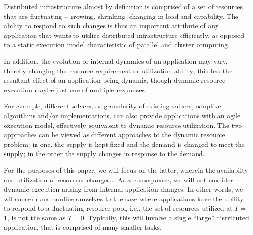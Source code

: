 \documentclass[conference,final]{IEEEtran}
\newcommand{\jhanote}[1]{ {\textcolor{red} { ***shantenu: #1 }}}
\newcommand{\jhanote}[1]{}
\begin{document}
Distributed infrastructure almost by definition is comprised  of a
set of resources that are fluctuating -- growing, shrinking, changing
in load and capability.  The ability to respond to such changes is
thus an important attribute of any application that wants to utilize
distributed infrastructure efficiently, as opposed to a static
execution model characteristic of parallel and cluster computing.


In addition, the evolution or internal dynamics of an application may
vary, thereby changing the resource requirement or utilization
ability; this has the resultant effect of an application being
dynamic, though dynamic resource execution maybe just one of multiple
responses.
 
For example, different solvers, or granularity of existing solvers,
adaptive algorithms and/or implementations, can also provide
applications with an agile execution model, effectively equivalent to
dynamic resource utilization. The two approaches can be viewed as
different approaches to the dynamic resource problem: in one, the
supply is kept fixed and the demand is changed to meet the supply; in
the other the supply changes in response to the demand.

For the purposes of this paper, we will focus on the latter, wherein
the availabilty and utilization of resources changes...  As a
consequence, we will not consider dynamic execution arising from
internal application changes.  In other words, we wil concern
and confine ourselves to  %
the case where applications have the ability to respond to a
fluctuating resource pool, i.e., the set of resources utilized at
$T=$1, is not the same as $T=$0.  Typically, this will involve a
single ``large'' distributed application, that is comprised of many
smaller tasks.

 




\end{document}
